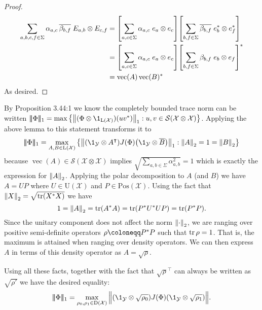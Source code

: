 \documentclass[boxes,pages,color=SeaGreen]{homework}
\renewcommand{\vec}{\operatorname{vec}}
\newcommand{\X}{\mathcal{X}}
\newcommand{\Y}{\mathcal{Y}}
\newcommand{\Lin}{\mathrm{L}}
\newcommand{\Pos}{\mathrm{Pos}}
\newcommand{\Unitary}{\mathrm{U}}
\newcommand{\Density}{\mathrm{D}}
\newcommand{\triplenorm}[1]{
  \lvert\!\lvert\!\lvert #1 
  \rvert\!\rvert\!\rvert}
\begin{document}
\begin{solution}
\begin{proof}
        \begin{align*}
            \sum_{a,b,c,f\in\Sigma}\alpha_{a,c}\,\overline{\beta_{b,f}}\;E_{a,b}\otimes E_{c,f} & = \qty[\sum_{a,c\in\Sigma}\alpha_{a,c}\;e_a\otimes e_c]\qty[\sum_{b,f\in\Sigma}\overline{\beta_{b,f}}\;e_b^*\otimes e_f^*] \\
                                                                                                & = \qty[\sum_{a,c\in\Sigma}\alpha_{a,c}\;e_a\otimes e_c]\qty[\sum_{b,f\in\Sigma}\beta_{b,f}\;e_b\otimes e_f]^*              \\
                                                                                                & = \vec(A)\vec(B)^*
        \end{align*}
        As desired.
    \end{proof}
    By Proposition 3.44:1 we know the completely bounded trace norm can be written $\triplenorm{\Phi}_1 = \max\qty{\norm{(\Phi\otimes\1_{\Lin(\X)})(uv^*)}_1: u,v\in\mathcal{S}(\X\otimes\X)}$.
    Applying the above lemma to this statement transforms it to
    \begin{equation*}
        \triplenorm{\Phi}_1 = \max_{A,B\in\Lin(\X)}\qty{\norm{\qty(\1_\Y\otimes A^\intercal)J(\Phi)\qty(\1_\Y\otimes\overline{B})}_1 : \norm{A}_2 = 1 = \norm{B}_2}
    \end{equation*}
    because $\vec(A)\in\mathcal{S}(\X\otimes\X)$ implies $\sqrt{\sum_{a,b\in\Sigma}\alpha_{a,b}^2} = 1$ which is exactly the expression for $\norm{A}_2$.
    Applying the polar decomposition to $A$ (and $B$) we have $A = UP$ where $U\in\Unitary(\X)$ and $P\in\Pos(\X)$.
    Using the fact that $\norm{X}_2 = \sqrt{\tr(X^*X)}$ we have
    \begin{equation*}
        1 = \norm{A}_2 = \tr(A^*A) = \tr(P^*U^*UP) = \tr(P^*P).
    \end{equation*}
    Since the unitary component does not affect the norm $\norm{\cdot}_2$, we are ranging over positive semi-definite operators $\rho \defeq P^*P$ such that $\tr \rho = 1$.
    That is, the maximum is attained when ranging over density operators.
    We can then express $A$ in terms of this density operator as $A = \sqrt{\rho}$.

    Using all these facts, together with the fact that $\sqrt{\rho}^\intercal$ can always be written as $\sqrt{\rho'}$ we have the desired equality:
    \begin{equation*}
        \triplenorm{\Phi}_1 = \max_{\rho_0,\rho_1\in\Density(\X)} \norm\Big{\qty(\1_\Y\otimes\sqrt{\rho_0})J(\Phi)\qty(\1_\Y\otimes\sqrt{\rho_1})}.
    \end{equation*}
\end{solution}
\end{document}
